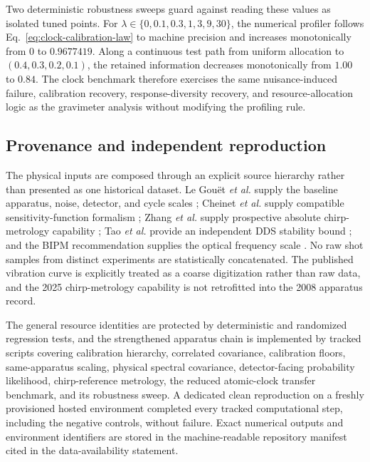 Two deterministic robustness sweeps guard against reading these values as isolated tuned points. For $\lambda\in\{0,0.1,0.3,1,3,9,30\}$, the numerical profiler follows Eq.~\eqref{eq:clock-calibration-law} to machine precision and increases monotonically from $0$ to $0.9677419$. Along a continuous test path from uniform allocation to $(0.4,0.3,0.2,0.1)$, the retained information decreases monotonically from $1.00$ to $0.84$. The clock benchmark therefore exercises the same nuisance-induced failure, calibration recovery, response-diversity recovery, and resource-allocation logic as the gravimeter analysis without modifying the profiling rule.

\subsection{Provenance and independent reproduction}

The physical inputs are composed through an explicit source hierarchy rather than presented as one historical dataset. Le Gou\"et \emph{et al.} supply the baseline apparatus, noise, detector, and cycle scales \cite{LeGouet2008}; Cheinet \emph{et al.} supply compatible sensitivity-function formalism \cite{Cheinet2008}; Zhang \emph{et al.} supply prospective absolute chirp-metrology capability \cite{Zhang2025}; Tao \emph{et al.} provide an independent DDS stability bound \cite{Tao2015}; and the BIPM recommendation supplies the optical frequency scale \cite{BIPM2015}. No raw shot samples from distinct experiments are statistically concatenated. The published vibration curve is explicitly treated as a coarse digitization rather than raw data, and the 2025 chirp-metrology capability is not retrofitted into the 2008 apparatus record.

The general resource identities are protected by deterministic and randomized regression tests, and the strengthened apparatus chain is implemented by tracked scripts covering calibration hierarchy, correlated covariance, calibration floors, same-apparatus scaling, physical spectral covariance, detector-facing probability likelihood, chirp-reference metrology, the reduced atomic-clock transfer benchmark, and its robustness sweep. A dedicated clean reproduction on a freshly provisioned hosted environment completed every tracked computational step, including the negative controls, without failure. Exact numerical outputs and environment identifiers are stored in the machine-readable repository manifest cited in the data-availability statement.
